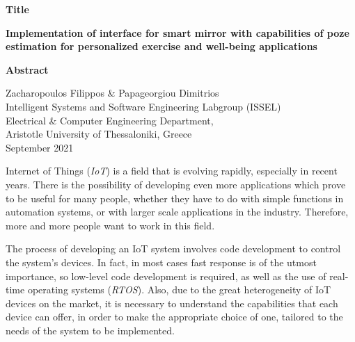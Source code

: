 {\selectfont

{}


\begin{center}
  \centering
  \textbf{\Large{Title}}
  \vspace{0.5cm}

  \textbf{\large{Implementation of interface for smart mirror with capabilities of poze estimation for personalized exercise and well-being applications}}

  \vspace{1cm}

  \centering
  \textbf{Abstract}
\end{center}


\begin{flushright}
  \vspace{2cm}
  Zacharopoulos Filippos \& Papageorgiou Dimitrios
  \\
  Intelligent Systems and Software Engineering Labgroup (ISSEL)
  \\
  Electrical \& Computer Engineering Department,
  \\
  Aristotle University of Thessaloniki, Greece
  \\
  September 2021
\end{flushright}

}

Internet of Things (\textit{IoT}) is a field that is evolving rapidly, especially in recent years. There is the possibility of developing even more applications which prove to be useful for many people, whether they have to do with simple functions in automation systems, or with larger scale applications in the industry. Therefore, more and more people want to work in this field.

The process of developing an IoT system involves code development to control the system's devices. In fact, in most cases fast response is of the utmost importance, so low-level code development is required, as well as the use of real-time operating systems (\textit{RTOS}). Also, due to the great heterogeneity of IoT devices on the market, it is necessary to understand the capabilities that each device can offer, in order to make the appropriate choice of one, tailored to the needs of the system to be implemented.

